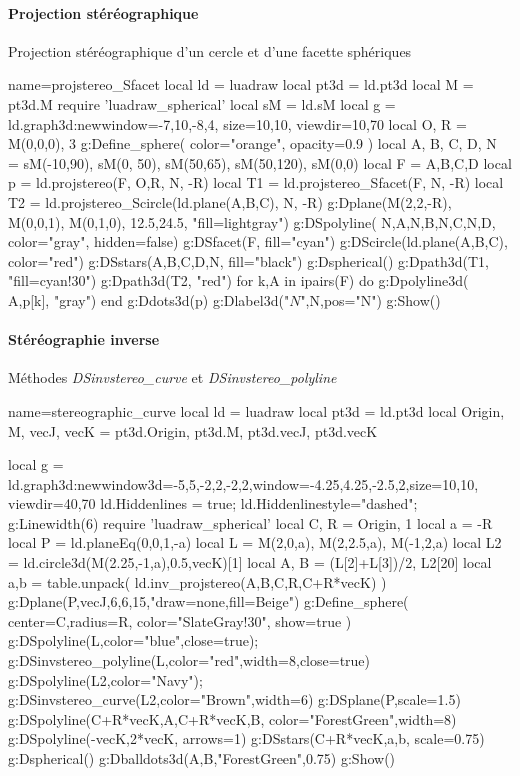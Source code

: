 \paragraph{Projection stéréographique}

\begin{demo}{Projection stéréographique d'un cercle et d'une facette sphériques}
\begin{luadraw}{name=projstereo_Sfacet}
local ld = luadraw
local pt3d = ld.pt3d
local M = pt3d.M
require 'luadraw_spherical'
local sM = ld.sM
local g = ld.graph3d:new{window={-7,10,-8,4}, size={10,10}, viewdir={10,70}}
local O, R = M(0,0,0), 3
g:Define_sphere( {color="orange", opacity=0.9} )
local A, B, C, D, N = sM(-10,90), sM(0, 50), sM(50,65), sM(50,120), sM(0,0)
local F = {A,B,C,D}
local p = ld.projstereo(F, {O,R}, N, -R)
local T1 = ld.projstereo_Sfacet(F, N, -R)
local T2 = ld.projstereo_Scircle(ld.plane(A,B,C), N, -R)
g:Dplane({M(2,2,-R), M(0,0,1)}, M(0,1,0), 12.5,24.5, "fill=lightgray")
g:DSpolyline( {{N,A},{N,B},{N,C},{N,D}}, {color="gray", hidden=false})
g:DSfacet(F, {fill="cyan"})
g:DScircle(ld.plane(A,B,C), {color="red"})
g:DSstars({A,B,C,D,N}, {fill="black"})
g:Dspherical()
g:Dpath3d(T1, "fill=cyan!30")
g:Dpath3d(T2, "red")
for k,A in ipairs(F) do 
    g:Dpolyline3d( {A,p[k]}, "gray")
end
g:Ddots3d(p)
g:Dlabel3d("$N$",N,{pos="N"})
g:Show()
\end{luadraw}
\end{demo}

\paragraph{Stéréographie inverse}

\begin{demo}{Méthodes \emph{DSinvstereo\_curve} et \emph{DSinvstereo\_polyline}}
\begin{luadraw}{name=stereographic_curve}
local ld = luadraw
local pt3d = ld.pt3d
local Origin, M, vecJ, vecK = pt3d.Origin, pt3d.M, pt3d.vecJ, pt3d.vecK

local g = ld.graph3d:new{window3d={-5,5,-2,2,-2,2},window={-4.25,4.25,-2.5,2},size={10,10}, viewdir={40,70}}
ld.Hiddenlines = true; ld.Hiddenlinestyle="dashed"; g:Linewidth(6)
require 'luadraw_spherical'
local C, R = Origin, 1
local a = -R
local P = ld.planeEq(0,0,1,-a)
local L = {M(2,0,a), M(2,2.5,a), M(-1,2,a)}
local L2 = ld.circle3d(M(2.25,-1,a),0.5,vecK)[1]
local A, B = (L[2]+L[3])/2, L2[20]
local a,b = table.unpack( ld.inv_projstereo({A,B},{C,R},C+R*vecK) )
g:Dplane(P,vecJ,6,6,15,"draw=none,fill=Beige")
g:Define_sphere( {center=C,radius=R, color="SlateGray!30", show=true} )
g:DSpolyline(L,{color="blue",close=true}); g:DSinvstereo_polyline(L,{color="red",width=8,close=true})
g:DSpolyline(L2,{color="Navy"}); g:DSinvstereo_curve(L2,{color="Brown",width=6})
g:DSplane(P,{scale=1.5})
g:DSpolyline({{C+R*vecK,A},{C+R*vecK,B}}, {color="ForestGreen",width=8})
g:DSpolyline({{-vecK,2*vecK}}, {arrows=1})
g:DSstars({C+R*vecK,a,b}, {scale=0.75})
g:Dspherical()
g:Dballdots3d({A,B},"ForestGreen",0.75)
g:Show()
\end{luadraw}
\end{demo}


